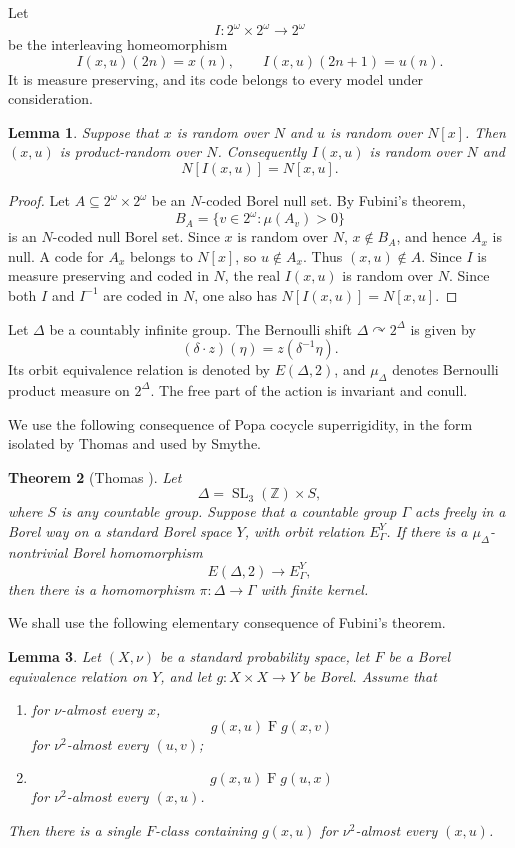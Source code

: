 \documentclass[11pt]{amsart}
\newtheorem{theorem}{Theorem}[section]
\newtheorem{lemma}[theorem]{Lemma}
\theoremstyle{definition}
\theoremstyle{remark}
\newcommand{\Z}{\mathbb Z}
\newcommand{\SL}{\operatorname{SL}}
\begin{document}
Let
\[
 I\colon 2^\omega\times2^\omega\longrightarrow2^\omega
\]
be the interleaving homeomorphism
\[
 I(x,u)(2n)=x(n),\qquad I(x,u)(2n+1)=u(n).
\]
It is measure preserving, and its code belongs to every model under consideration.

\begin{lemma}\label{lem:two-step}
Suppose that $x$ is random over $N$ and $u$ is random over $N[x]$.  Then $(x,u)$ is product-random over $N$.  Consequently $I(x,u)$ is random over $N$ and
\[
 N[I(x,u)]=N[x,u].
\]
\end{lemma}

\begin{proof}
Let $A\subseteq2^\omega\times2^\omega$ be an $N$-coded Borel null set.  By Fubini's theorem,
\[
 B_A=\{v\in2^\omega:\mu(A_v)>0\}
\]
is an $N$-coded null Borel set.  Since $x$ is random over $N$, $x\notin B_A$, and hence $A_x$ is null.  A code for $A_x$ belongs to $N[x]$, so $u\notin A_x$.  Thus $(x,u)\notin A$.  Since $I$ is measure preserving and coded in $N$, the real $I(x,u)$ is random over $N$.  Since both $I$ and $I^{-1}$ are coded in $N$, one also has $N[I(x,u)]=N[x,u]$.
\end{proof}

Let $\Delta$ be a countably infinite group.  The Bernoulli shift $\Delta\curvearrowright2^\Delta$ is given by
\[
 (\delta\cdot z)(\eta)=z(\delta^{-1}\eta).
\]
Its orbit equivalence relation is denoted by $E(\Delta,2)$, and $\mu_\Delta$ denotes Bernoulli product measure on $2^\Delta$.  The free part of the action is invariant and conull.

We use the following consequence of Popa cocycle superrigidity, in the form isolated by Thomas and used by Smythe.

\begin{theorem}[Thomas {\cite[Theorem~3.6]{Thomas}}]\label{thm:Thomas}
Let
\[
 \Delta=\SL_3(\Z)\times S,
\]
where $S$ is any countable group.  Suppose that a countable group $\Gamma$ acts freely in a Borel way on a standard Borel space $Y$, with orbit relation $E^Y_\Gamma$.  If there is a $\mu_\Delta$-nontrivial Borel homomorphism
\[
 E(\Delta,2)\longrightarrow E^Y_\Gamma,
\]
then there is a homomorphism $\pi\colon\Delta\to\Gamma$ with finite kernel.
\end{theorem}

We shall use the following elementary consequence of Fubini's theorem.

\begin{lemma}\label{lem:symmetrization}
Let $(X,\nu)$ be a standard probability space, let $F$ be a Borel equivalence relation on $Y$, and let $g\colon X\times X\to Y$ be Borel.  Assume that
\begin{enumerate}
\item for $\nu$-almost every $x$,
\[
 g(x,u)\mathrel{F}g(x,v)
\]
for $\nu^2$-almost every $(u,v)$;
\item
\[
 g(x,u)\mathrel{F}g(u,x)
\]
for $\nu^2$-almost every $(x,u)$.
\end{enumerate}
Then there is a single $F$-class containing $g(x,u)$ for $\nu^2$-almost every $(x,u)$.
\end{lemma}
\end{document}
